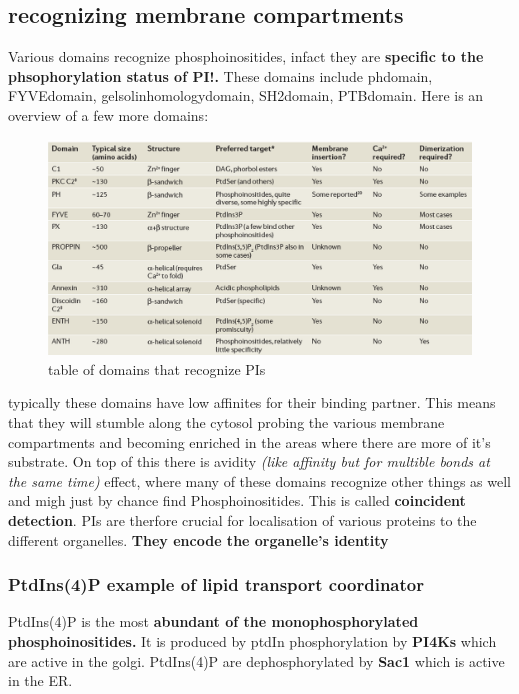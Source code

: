 \documentclass[../main.tex]{subfiles}
\begin{document}
\subsection{recognizing membrane compartments}
Various domains recognize phosphoinositides, infact they are \textbf{ specific to the phsophorylation status of PI!.} These domains include \gls{phdomain}, \gls{FYVEdomain}, \gls{gelsolinhomologydomain}, \gls{SH2domain}, \gls{PTBdomain}. Here is an overview of a few more domains:
\begin{figure}[H]
    \centering
    \includegraphics[width=\linewidth]{domainOverview.png}
    \caption{table of domains that recognize PIs}
    \label{fig:enter-label}
\end{figure}

typically these domains have low affinites for their binding partner. This means that they will stumble along the cytosol probing the various membrane compartments and becoming enriched in the areas where there are more of it's substrate. On top of this there is avidity \textit{(like affinity but for multible bonds at the same time)} effect, where many of these domains recognize other things as well and migh just by chance find Phosphoinositides. This is called \textbf{coincident detection}. PIs are therfore crucial for localisation of various proteins to the different organelles. \textbf{They encode the organelle's identity}

\subsubsection{PtdIns(4)P example of lipid transport coordinator}
PtdIns(4)P is the most \textbf{abundant of the monophosphorylated  
phosphoinositides.} It is produced by ptdIn phosphorylation by \textbf{\gls{PI4Ks}} which are active in the golgi. PtdIns(4)P are dephosphorylated by \textbf{\gls{Sac1} }which is active in the ER. 
\end{document}
